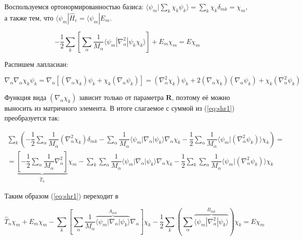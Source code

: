 \documentclass[12pt, oneside]{article}
\numberwithin{equation}{section}  %
\begin{document}
Воспользуемся ортонормированностью базиса: \(\langle \psi_m | \sum_k \chi_k \psi_k \rangle = \sum_k \chi_k \delta_{mk} = \chi_m\), а также тем, что \(\langle \psi_m | \hat{H}_e = \langle \psi_m | E_m \).

\begin{equation}
- \frac{1}{2} \sum_{k} \left[ \sum_\alpha \frac{1}{M_\alpha} \langle \psi_m |\nabla_\alpha^2 | \psi_k \chi_k \rangle \right]
+ E_m \chi_m = E \chi_m
\label{eq:shr1}
\end{equation}

Распишем лапласиан:

\[\nabla_\alpha \nabla_\alpha \chi_k \psi_k = \nabla_\alpha \left[(\nabla_\alpha \chi_k ) \psi_k + \chi_k (\nabla_\alpha \psi_k)\right] = (\nabla_\alpha^2 \chi_k ) \psi_k + 2 (\nabla_\alpha \chi_k) (\nabla_\alpha \psi_k ) + \chi_k (\nabla_\alpha^2 \psi_k)\]

Функция вида \((\nabla_\alpha \chi_k)\) зависит только от параметра \(\bm{R}\), поэтому её можно выносить из матричного элемента. В итоге слагаемое с суммой из (\ref{eq:shr1}) преобразуется так:

\begin{equation}
\begin{split}
    \sum_k \left(- \dfrac{1}{2} \sum_\alpha \dfrac{1}{M_\alpha} (\nabla_\alpha^2 \chi_k) \delta_{mk} - \sum_\alpha \dfrac{1}{M_\alpha} \langle \psi_m | \nabla_\alpha| \psi_k \rangle \nabla_\alpha \chi_k - \dfrac{1}{2} \sum_\alpha \dfrac{1}{M_\alpha} \langle \psi_m |(\nabla_\alpha^2 \psi_k) \rangle \chi_k \right) =\\
     = \underbrace{\left[- \dfrac{1}{2} \sum_\alpha \dfrac{1}{M_\alpha} \nabla_\alpha^2 \right]}_{\hat{T}_n} \chi_m - \sum_k \sum_\alpha \dfrac{1}{M_\alpha} \langle \psi_m | \nabla_\alpha | \psi_k \rangle \nabla_\alpha \chi_k - \dfrac{1}{2} \sum_k \sum_\alpha \dfrac{1}{M_\alpha} \langle \psi_m |(\nabla_\alpha^2 \psi_k) \rangle \chi_k 
\end{split}
\end{equation}

Таким образом (\ref{eq:shr1}) переходит в 

\begin{equation}
    \hat{T}_n \chi_m + E_m \chi_m - \sum_k \left[\sum_\alpha \dfrac{1}{M_\alpha} \overbrace{\langle \psi_m |\nabla_\alpha | \psi_k \rangle}^{A_{mk}} \nabla_\alpha \right] \chi_k - \dfrac{1}{2} \sum_k \left(\sum_\alpha \overbrace{\langle \psi_m | \nabla^2_\alpha | \psi_k \rangle}^{B_{mk}} \right) \chi_k = E \chi_m 
    \label{eq:shr2}
\end{equation}
\end{document}
